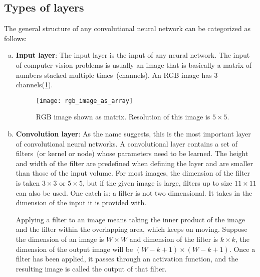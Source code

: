 \subsection{Types of layers}
\label{subsection:types_of_layers}
The general structure of any convolutional neural network can be categorized as follows:
\begin{enumerate}[(a)]
    \item \textbf{Input layer}:
        The input layer is the input of any neural network. The input of computer vision problems is usually an image that is basically a matrix of numbers stacked multiple times~(channels). An RGB image has 3 channels(\cref{fig:RGB_image}).
        \begin{figure}[h!]
            \centering
            \texttt{[image: rgb\_image\_as\_array]}
            \caption[RGB image shown as matrix]{RGB image shown as matrix. Resolution of this image is $5\times5$.}
            \label{fig:RGB_image}
        \end{figure}
        
    \item \textbf{Convolution layer}:
        As the name suggests, this is the most important layer of convolutional neural networks. A convolutional layer contains a set of filters~(or kernel or node) whose parameters need to be learned. The height and width of the filter are predefined when defining the layer and are smaller than those of the input volume. For most images, the dimension of the filter is taken $3\times3$ or $5\times5$, but if the given image is large, filters up to size $11\times11$ can also be used. One catch is: a filter is not two dimensional. It takes in the dimension of the input it is provided with.

        Applying a filter to an image means taking the inner product of the image and the filter within the overlapping area, which keeps on moving. Suppose the dimension of an image is $W\times W$ and dimension of the filter is $k\times k$, the dimension of the output image will be $(W-k+1)\times (W-k+1)$. Once a filter has been applied, it passes through an activation function, and the resulting image is called the output of that filter.
    

\end{enumerate}
